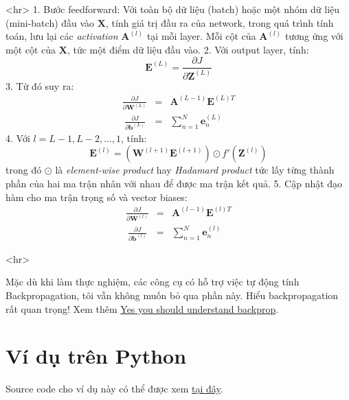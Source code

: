  <hr> 
 1. Bước feedforward: Với toàn bộ dữ liệu (batch) hoặc một nhóm dữ liệu (mini-batch) đầu vào $\mathbf{X}$, tính giá trị đầu ra của network, trong quá trình tính toán, lưu lại các \textit{activation} $\mathbf{A}^{(l)}$ tại mỗi layer. Mỗi cột của $\mathbf{A}^{(l)}$ tương ứng với một cột của $\mathbf{X}$, tức một điểm dữ liệu đầu vào. 
 2. Với output layer, tính: \begin{equation*}\mathbf{E}^{(L)} = \frac{\partial J}{\partial \mathbf{Z}^{(L)}}\end{equation*} 
 3. Từ đó suy ra: 
 \begin{equation*} 
 \begin{eqnarray} 
 \frac{\partial J}{\partial \mathbf{W}^{(L)}} &=&  \mathbf{A}^{(L-1)}\mathbf{E}^{(L)T}\\\ 
 \frac{\partial J}{\partial \mathbf{b}^{(L)}} &=&  \sum_{n=1}^N\mathbf{e}_n^{(L)} 
 \end{eqnarray} 
 \end{equation*} 
 4. Với $l = L-1, L-2, ..., 1$, tính: 
 \begin{equation*} 
 \mathbf{E}^{(l)} = \left( \mathbf{W}^{(l+1)} \mathbf{E}^{(l+1)} \right) \odot f'(\mathbf{Z}^{(l)}) 
 \end{equation*} 
 trong đó $\odot$ là \textit{element-wise product} hay \textit{Hadamard product} tức lấy từng thành phần của hai ma trận nhân với nhau để được ma trận kết quả. 
 5. Cập nhật đạo hàm cho ma trận trọng số và vector biases: 
 \begin{equation*} 
 \begin{eqnarray} 
 \frac{\partial J}{\partial \mathbf{W}^{(l)}} &=&  \mathbf{A}^{(l-1)}\mathbf{E}^{(l)T}\\\ 
 \frac{\partial J}{\partial \mathbf{b}^{(l)}} &=&  \sum_{n=1}^N\mathbf{e}_n^{(l)} 
 \end{eqnarray} 
 \end{equation*} 
 
 <hr> 
 
 
 Mặc dù khi làm thực nghiệm, các công cụ có hỗ trợ việc tự động tính Backpropagation, tôi vẫn không muốn bỏ qua phần này. Hiểu backpropagation rất quan trọng! Xem thêm \href{https://medium.com/@karpathy/yes-you-should-understand-backprop-e2f06eab496b#.g76s9xxzc}{Yes you should understand backprop}. 
 
 
\section{Ví dụ trên Python}
Source code cho ví dụ này có thể được xem \href{https://github.com/tiepvupsu/tiepvupsu.github.io/blob/master/assets/14_mlp/Example%20.ipynb}{tại đây}. 
 
